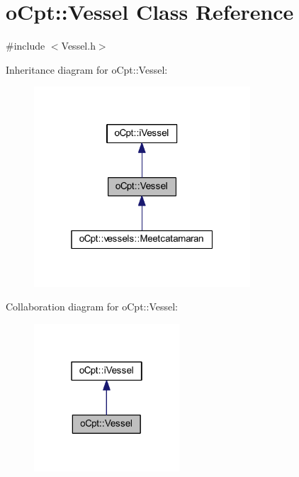 \hypertarget{classo_cpt_1_1_vessel}{}\section{o\+Cpt\+:\+:Vessel Class Reference}
\label{classo_cpt_1_1_vessel}


{\ttfamily \#include $<$Vessel.\+h$>$}



Inheritance diagram for o\+Cpt\+:\+:Vessel\+:
\nopagebreak
\begin{figure}[H]
\begin{center}
\leavevmode
\includegraphics[width=229pt]{classo_cpt_1_1_vessel__inherit__graph}
\end{center}
\end{figure}


Collaboration diagram for o\+Cpt\+:\+:Vessel\+:
\nopagebreak
\begin{figure}[H]
\begin{center}
\leavevmode
\includegraphics[width=154pt]{classo_cpt_1_1_vessel__coll__graph}
\end{center}
\end{figure}
